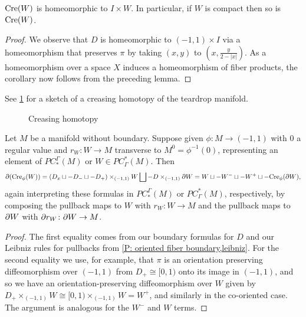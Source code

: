 \begin{corollary}
	$\mathrm{Cre}(W)$ is homeomorphic to $I \times W$.
	In particular, if $W$ is compact then so is $\mathrm{Cre}(W)$.
\end{corollary}

\begin{proof}
	We observe that $D$ is homeomorphic to $(-1,1) \times I$ via a homeomorphism that preserves $\pi$ by taking $(x,y)$ to $\left(x, \frac{y}{2-|x|}\right)$.
	As a homeomorphism over a space $X$ induces a homeomorphism of fiber products, the corollary now follows from the preceding lemma.
\end{proof}


See \cref{F: creasing} for a sketch of a creasing homotopy of the teardrop manifold.

\begin{figure}[h!]
	
	\caption{Creasing homotopy}
	\label{F: creasing}
\end{figure}

\begin{lemma}\label{E: bd crease}
	Let $M$ be a manifold without boundary.
	Suppose given $\phi \colon M \to (-1,1)$ with $0$ a regular value and $r_W \colon W \to M$ transverse to $M^0 = \phi^{-1}(0)$, representing an element of $PC^\Gamma_*(M)$ or $W \in PC_\Gamma^*(M)$.
	Then
	\begin{equation*}
		\partial(\mathrm{Cre}_\phi(W)) = (D_x \sqcup -D_- \sqcup -D_+)\times_{(-1,1)} W \bigsqcup -D\times_{(-1,1)}\partial W = W \sqcup -W^- \sqcup -W^+ \sqcup -\mathrm{Cre}_\phi(\partial W),
	\end{equation*}
	again interpreting these formulas in $PC^\Gamma_*(M)$ or $PC_\Gamma^*(M)$, respectively, by composing the pullback maps to $W$ with $r_W \colon W \to M$ and the pullback maps to $\partial W$ with $\partial r_W \colon \partial W \to M$.
\end{lemma}

\begin{proof}
	The first equality comes from our boundary formulas for $D$ and our Leibniz rules for pullbacks from \cref{P: oriented fiber boundary,leibniz}.
	For the second equality we use, for example, that $\pi$ is an orientation preserving diffeomorphism over $(-1,1)$ from $D_+ \cong [0,1)$ onto its image in $(-1,1)$, and so we have an orientation-preserving diffeomorphism over $W$ given by $D_+\times_{(-1,1)} W \cong [0,1)\times_{(-1,1)} W = W^+$, and similarly in the co-oriented case.
	The argument is analogous for the $W^-$ and $W$ terms.
\end{proof}

